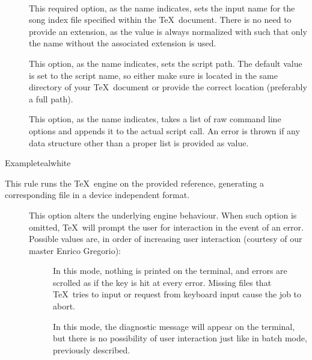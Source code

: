 \begin{description}
\begin{description}
\item[~\rqbox] This required option, as the name indicates, sets the input name for the song index file specified within the \TeX\ document. There is no need to provide an extension, as the value is always normalized with  such that only the name without the associated extension is used.

\item[] This option, as the name indicates, sets the script path. The default value is set to the script name, so either make sure  is located in the same directory of your \TeX\ document or provide the correct location (preferably a full path).

\item[] This option, as the name indicates, takes a list of raw command line options and appends it to the actual script call. An error is thrown if any data structure other than a proper list is provided as value.
\end{description}

\begin{codebox}{Example}{teal}{\icnote}{white}
\end{codebox}


\item[\rulebox{tex}{Marco Daniel, Paulo Cereda}] This rule runs the  \TeX\ engine on the provided  reference, generating a corresponding file in a device independent format.

\begin{description}
\item[] This option alters the underlying engine behaviour. When such option is omitted, \TeX\ will prompt the user for interaction in the event of an error. Possible values are, in order of increasing user interaction (courtesy of our master Enrico Gregorio):

\begin{description}
\item[] In this mode, nothing is printed on the terminal, and errors are scrolled as if the  key is hit at every error. Missing files that \TeX\ tries to input or request from keyboard input cause the job to abort.

\item[] In this mode, the diagnostic message will appear on the terminal, but there is no possibility of user interaction just like in batch mode, previously described.


\end{description}
\end{description}
\end{description}
